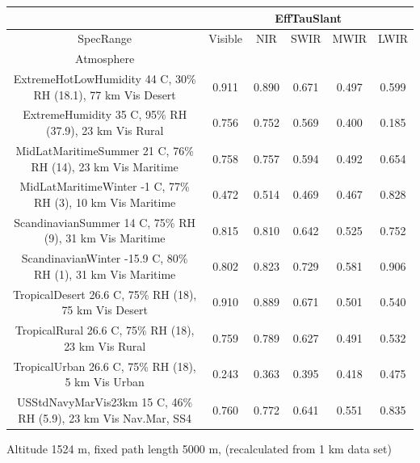 \documentclass{workpackage}
\begin{document}
\begin{center}

\begin{footnotesize}

\begin{tabular}{|c|c|c|c|c|c|}
\hline
&\multicolumn{5}{|c|}{EffTauSlant}\\\hline
SpecRange&Visible&NIR&SWIR&MWIR&LWIR\\\hline
Atmosphere&&&&&\\\hline
ExtremeHotLowHumidity 44 C, 30\% RH (18.1), 77 km Vis Desert&0.911&0.890&0.671&0.497&0.599\\\hline
ExtremeHumidity 35 C, 95\% RH (37.9), 23 km Vis Rural&0.756&0.752&0.569&0.400&0.185\\\hline
MidLatMaritimeSummer 21 C, 76\% RH (14), 23 km Vis Maritime&0.758&0.757&0.594&0.492&0.654\\\hline
MidLatMaritimeWinter -1 C, 77\% RH (3), 10 km Vis Maritime&0.472&0.514&0.469&0.467&0.828\\\hline
ScandinavianSummer 14 C, 75\% RH (9), 31 km Vis Maritime&0.815&0.810&0.642&0.525&0.752\\\hline
ScandinavianWinter -15.9 C, 80\% RH (1), 31 km Vis Maritime&0.802&0.823&0.729&0.581&0.906\\\hline
TropicalDesert 26.6 C, 75\% RH (18), 75 km Vis Desert&0.910&0.889&0.671&0.501&0.540\\\hline
TropicalRural 26.6 C, 75\% RH (18), 23 km Vis Rural&0.759&0.789&0.627&0.491&0.532\\\hline
TropicalUrban 26.6 C, 75\% RH (18), 5 km Vis Urban&0.243&0.363&0.395&0.418&0.475\\\hline
USStdNavyMarVis23km 15 C, 46\% RH (5.9), 23 km Vis Nav.Mar, SS4&0.760&0.772&0.641&0.551&0.835\\\hline

\end{tabular}
\end{footnotesize}
\end{center}

Altitude 1524 m, fixed path length 5000 m, (recalculated from 1 km data set)
\end{document}
